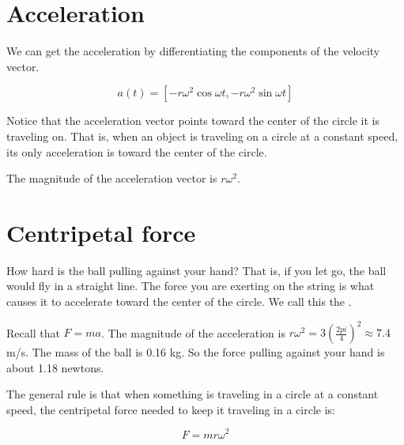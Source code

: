 \section{Acceleration}

We can get the acceleration by differentiating the components of the velocity vector.

$$a(t) = \left[-r \omega^2 \cos{\omega t}, -r \omega^2 \sin{\omega t} \right]$$

Notice that the acceleration vector points toward the center of the
circle it is traveling on.  That is, when an object is traveling on a
circle at a constant speed, its only acceleration is toward the center
of the circle.


The magnitude of the acceleration vector is $r \omega^2$.

\section{Centripetal force}

How hard is the ball pulling against your hand?  That is, if you let
go, the ball would fly in a straight line.  The force you are exerting
on the string is what causes it to accelerate toward the center of the
circle. We call this the .

Recall that $F = m a$.  The magnitude of the acceleration is $r
\omega^2 = 3 \left(\frac{2 pi}{4}\right)^2 \approx 7.4$ m/s.  The mass
of the ball is 0.16 kg.  So the force pulling against your hand is
about 1.18 newtons.

The general rule is that when something is traveling in a circle at a
constant speed, the centripetal force needed to keep it traveling in a
circle is:

$$F = m r \omega^2$$


